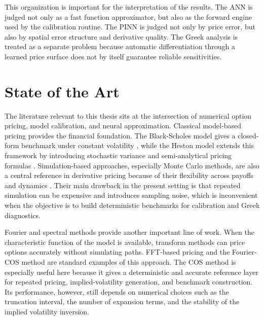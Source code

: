 This organization is important for the interpretation of the results. 
The ANN is judged not only as a fast function approximator, but also as the forward engine used by the calibration routine. 
The PINN is judged not only by price error, but also by spatial error structure and derivative quality. 
The Greek analysis is treated as a separate problem because automatic differentiation through a learned price surface does not by itself guarantee reliable sensitivities.

\section{State of the Art}

The literature relevant to this thesis sits at the intersection of numerical option pricing, model calibration, and neural approximation. Classical model-based pricing provides the financial foundation. The Black-Scholes model gives a closed-form benchmark under constant volatility \cite{black_scholes_1973}, while the Heston model extends this framework by introducing stochastic variance and semi-analytical pricing formulas \cite{heston}. Simulation-based approaches, especially Monte Carlo methods, are also a central reference in derivative pricing because of their flexibility across payoffs and dynamics \cite{boyle1977montecarlo}. Their main drawback in the present setting is that repeated simulation can be expensive and introduces sampling noise, which is inconvenient when the objective is to build deterministic benchmarks for calibration and Greek diagnostics.

Fourier and spectral methods provide another important line of work.
When the characteristic function of the model is available, transform methods can price options accurately without simulating paths. 
FFT-based pricing \cite{carr_madan_1999} and the Fourier-COS method \cite{fang_oosterlee_2009} are standard examples of this approach. 
The COS method is especially useful here because it gives a deterministic and accurate reference layer for repeated pricing, implied-volatility generation, and benchmark construction. 
Its performance, however, still depends on numerical choices such as the truncation interval, the number of expansion terms, and the stability of the implied volatility inversion.

